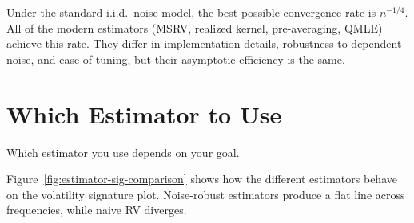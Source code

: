 \begin{keyidea}
Under the standard i.i.d.\ noise model, the best possible convergence rate is $n^{-1/4}$.
All of the modern estimators (MSRV, realized kernel, pre-averaging, QMLE) achieve this rate.
They differ in implementation details, robustness to dependent noise, and ease of tuning, but their asymptotic efficiency is the same.
\end{keyidea}


\section{Which Estimator to Use}
\label{sec:which-estimator}

Which estimator you use depends on your goal.

Figure~\ref{fig:estimator-sig-comparison} shows how the different estimators behave on the volatility signature plot.
Noise-robust estimators produce a flat line across frequencies, while naive RV diverges.

